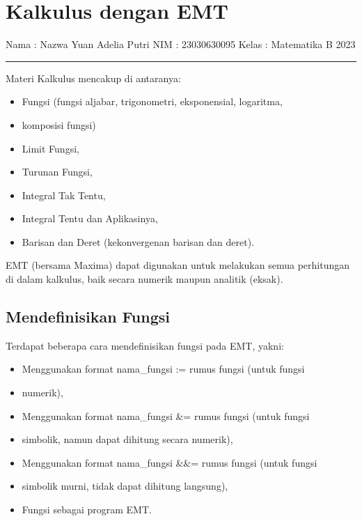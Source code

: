 \documentclass[
]{book}
\author{}
\date{}
\begin{document}
\frontmatter

\mainmatter
\chapter{Kalkulus dengan EMT}\label{kalkulus-dengan-emt}

Nama : Nazwa Yuan Adelia Putri NIM : 23030630095 Kelas : Matematika B 2023

\begin{center}\rule{0.5\linewidth}{0.5pt}\end{center}

Materi Kalkulus mencakup di antaranya:

\begin{itemize}
\item
  Fungsi (fungsi aljabar, trigonometri, eksponensial, logaritma,
\item
  komposisi fungsi)
\item
  Limit Fungsi,
\item
  Turunan Fungsi,
\item
  Integral Tak Tentu,
\item
  Integral Tentu dan Aplikasinya,
\item
  Barisan dan Deret (kekonvergenan barisan dan deret).
\end{itemize}

EMT (bersama Maxima) dapat digunakan untuk melakukan semua perhitungan di dalam kalkulus, baik secara numerik maupun analitik (eksak).

\section{Mendefinisikan Fungsi}\label{mendefinisikan-fungsi}

Terdapat beberapa cara mendefinisikan fungsi pada EMT, yakni:

\begin{itemize}
\item
  Menggunakan format nama\_fungsi := rumus fungsi (untuk fungsi
\item
  numerik),
\item
  Menggunakan format nama\_fungsi \&= rumus fungsi (untuk fungsi
\item
  simbolik, namun dapat dihitung secara numerik),
\item
  Menggunakan format nama\_fungsi \&\&= rumus fungsi (untuk fungsi
\item
  simbolik murni, tidak dapat dihitung langsung),
\item
  Fungsi sebagai program EMT.
\end{itemize}
\end{document}
